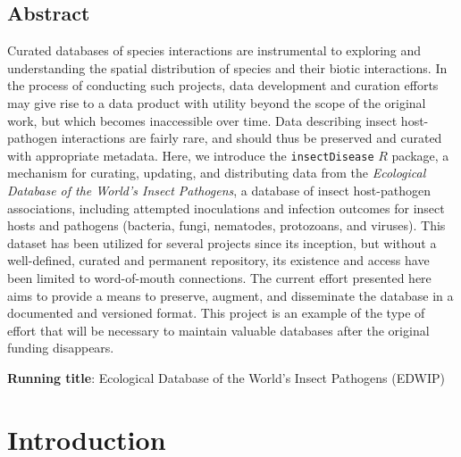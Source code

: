 \documentclass[12pt]{article}
\begin{document}
\subsection*{Abstract}
Curated databases of species interactions are instrumental to exploring and understanding the spatial distribution of species and their biotic interactions. In the process of conducting such projects, data development and curation efforts may give rise to a data product with utility beyond the scope of the original work, but which becomes inaccessible over time. Data describing insect host-pathogen interactions are fairly rare, and should thus be preserved and curated with appropriate metadata. Here, we introduce the \texttt{insectDisease} $R$ package, a mechanism for curating, updating, and distributing data from the \textit{Ecological Database of the World's Insect Pathogens}, a database of insect host-pathogen associations, including attempted inoculations and infection outcomes for insect hosts and pathogens (bacteria, fungi, nematodes, protozoans, and viruses). This dataset has been utilized for several projects since its inception, but without a well-defined, curated and permanent repository, its existence and access have been limited to word-of-mouth connections. The current effort presented here aims to provide a means to preserve, augment, and disseminate the database in a documented and versioned format. This project is an example of the type of effort that will be necessary to maintain valuable databases after the original funding disappears.



















\medskip

\noindent \textbf{Running title}: Ecological Database of the World's Insect Pathogens (EDWIP)  \\







 




\clearpage
{}
\section*{Introduction}
\end{document}
